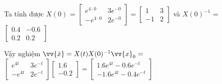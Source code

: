 \documentclass[a4paper]{article}
\begin{document}
Ta tính được $X(0)$ =
$
    \begin{bmatrix}
        e^{4\cdot0} & 3e^{-0} \\
        -e^{4\cdot0} & 2e^{-0}
    \end{bmatrix}
    = 
    \begin{bmatrix}
        1 & 3 \\
        -1 & 2
    \end{bmatrix}
$
và $X(0)^{-1}$ =
$
    \begin{bmatrix}
        0.4 & -0.6 \\
        0.2 & 0.2
    \end{bmatrix}
$ \par
Vậy nghiệm $\vv{\dot{x}} = X(t)X(0)^{-1}\vv{x}_0 =$
$
    \begin{bmatrix}
        e^{4t} & 3e^{-t} \\
        -e^{4t} & 2e^{-t}
    \end{bmatrix}
    \begin{bmatrix}
        1.6 \\
        -0.2
    \end{bmatrix}
    = 
    \begin{bmatrix}
        1.6e^{4t} - 0.6e^{-t} \\
        -1.6e^{4t} - 0.4e^{-t}
\end{bmatrix}
$
\newpage
\end{document}
